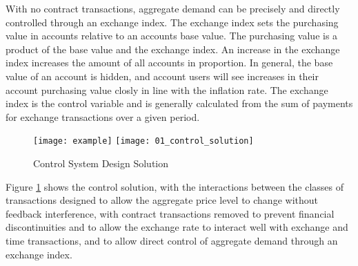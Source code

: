 With no contract transactions, aggregate demand can be precisely and directly controlled through an
exchange index.  The exchange index sets the purchasing value in accounts relative to an accounts
base value. The purchasing value is a product of the base value and the exchange index. An increase
in the exchange index increases the amount of all accounts in proportion. In general, the base value
of an account is hidden, and account users will see increases in their account purchasing value
closly in line with the inflation rate. The exchange index is the control variable and is generally
calculated from the sum of payments for exchange transactions over a given period.  

\begin{figure}
\centering
\texttt{[image: example]}
\texttt{[image: 01\_control\_solution]}
\caption{Control System Design Solution}
\label{fig:control_solution}
\end{figure}

Figure \ref{fig:control_solution} shows the control solution, with the interactions between the
classes of transactions designed to allow the aggregate price level to change without feedback
interference, with contract transactions removed to prevent financial discontinuities and to allow
the exchange rate to interact well with exchange and time transactions, and to allow direct control
of aggregate demand through an exchange index.
